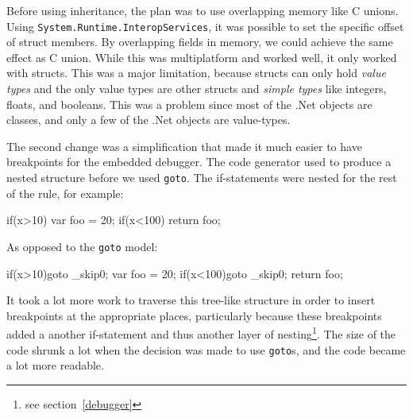 Before using inheritance, the plan was to use overlapping memory like C unions. 
Using \verb|System.|\verb|Runtime.|\verb|InteropServices|, it was possible to set the specific offset of struct members.
By overlapping fields in memory, we could achieve the same effect as C union.
While this was multiplatform and worked well, it only worked with structs.
This was a major limitation, because structs can only hold \textit{value types} and the only value types are other structs and \textit{simple types} like integers, floats, and booleans.
This was a problem since most of the .Net objects are classes, and only a few of the .Net objects are value-types.

The second change was a simplification that made it much easier to have breakpoints for the embedded debugger.
The code generator used to produce a nested structure before we used \verb|goto|.
The if-statements were nested for the rest of the rule, for example:

\begin{CS}
    if(x>10){
        var foo = 20;    
        if(x<100){
            return foo;
        }
    }
\end{CS}

As opposed to the \verb|goto| model:

\begin{CS}
    if(x>10){goto _skip0;}
    var foo = 20;    
    if(x<100){goto _skip0;}
    return foo;
\end{CS}

It took a lot more work to traverse this tree-like structure in order to insert breakpoints at the appropriate places, particularly because these breakpoints added a another if-statement and thus another layer of nesting\footnote{see section~\ref{debugger}}.
The size of the code shrunk a lot when the decision was made to use \verb|goto|s, and the code became a lot more readable.

